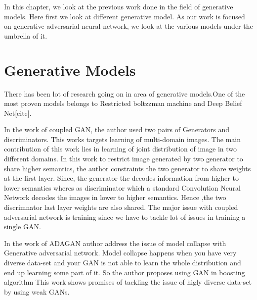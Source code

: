 

\doublespacing


In this chapter, we look at the previous work done in the field of generative models. Here first we look at different generative model. As our work is focused on generative adversarial neural network, we look at the various models under the umbrella of it. %
\section{Generative Models}

There has been lot of research going on in area of generative models.One of the most proven models belongs to Restricted boltzzman machine and Deep Belief Net[cite].


In the work of coupled GAN, the author used two pairs of Generators and discriminators. This works targets learning of multi-domain images. The main contribution of this work lies in learning of joint distribution of image in two different domains. In this work to restrict image generated by two generator to share higher semantics, the author constraints the two generator to share weights at the first layer. Since, the generator the decodes information from higher to lower semantics wheres as discriminator which a standard Convolution Neural Network decodes the images in lower to higher semantics. Hence ,the two discrimnator last layer weights are also shared. The major issue with coupled adversarial network is training since we have to tackle lot of issues in training a single GAN.
\par

In the work of ADAGAN author address the issue of model collapse with Generative adversarial network. Model collapse happens when you have very diverse data-set and your GAN is not able to learn the whole distribution and end up learning some part of it. So the author proposes using GAN in boosting algorithm This work shows promises of tackling the issue of higly diverse data-set by using weak GANs.
\par

